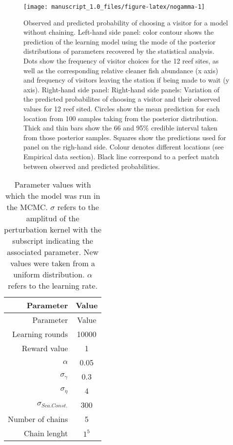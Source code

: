 \documentclass[]{rsos}%
\begin{document}
\begin{figure}[H]

{\centering \texttt{[image: manuscript\_1.0\_files/figure-latex/nogamma-1]} 

}

\caption{Observed and predicted probability of choosing a visitor for a model without chaining. Left-hand side panel: color contour shows the prediction of the learning model using the mode of the posterior distributions of parameters recovered by the statistical analysis. Dots show the frequency of visitor choices for the 12 reef sites, as well as the corresponding relative cleaner fish abundance (x axis) and frequency of visitors leaving the station if being made to wait (y axis). Right-hand side panel: Right-hand side panels: Variation of the predicted probabilites  of choosing a visitor and their observed values for 12 reef sited. Circles show the mean prediction for each location from 100 samples taking from the posterior distribution. Thick and thin bars show the 66 and 95\% credible interval taken from those posterior samples. Squares show the predictions used for panel on the righ-hand side. Colour denotes different locations (see Empirical data section). Black line correspond to a perfect match between observed and predicted probabilities.}\label{fig:nogamma}
\end{figure}

\begin{longtable}[]{@{}rc@{}}
\caption{\label{tab:param} Parameter values with which the model was run
in the MCMC. \(\sigma\) refers to the amplitud of the perturbation kernel with the subscript indicating the associated parameter. New values were taken from a uniform distribution. \(\alpha\) refers to the learning rate.}\tabularnewline
\toprule
Parameter & Value \\
\midrule
\endfirsthead
\toprule
Parameter & Value \\
\midrule
\endhead
Learning rounds & 10000 \\
Reward value & 1 \\
\(\alpha\) & 0.05 \\
\(\sigma_{\gamma}\) & 0.3 \\
\(\sigma_{\eta}\) & 4 \\
\(\sigma_{Sca.Const.}\) & 300 \\
Number of chains & 5 \\
Chain lenght & \(1^5\) \\
\bottomrule
\end{longtable}
\end{document}

